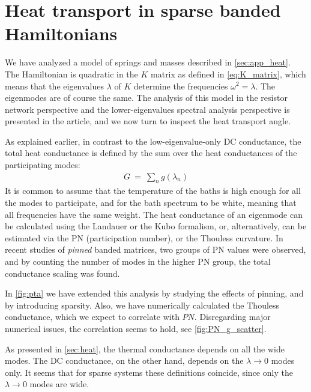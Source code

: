 \section{Heat transport in sparse banded Hamiltonians}\label{sec:PTA}


We have analyzed a model of springs and masses described in \autoref{sec:app_heat}.
The Hamiltonian is quadratic in the $K$ matrix as defined in \autoref{eq:K_matrix},
which means that the eigenvalues $\lambda$ of $K$ determine the frequencies $\omega^2 = \lambda$.
The eigenmodes are of course the same. The analysis of this model in the resistor network perspective
and the lower-eigenvalues spectral analysis perspective is presented in the article, and we now
turn to inspect the heat transport angle.


As explained earlier, in contrast to the low-eigenvalue-only DC conductance, 
the total heat conductance is defined by the
sum over the heat conductances of the participating modes:
%
\begin{align}
G \ =\ \sum_n g(\lambda_n)
\end{align}
%
It is common to assume
that the temperature of the baths is high enough for all the modes to
participate, and for the bath spectrum to be white, meaning that all frequencies
have the same weight. The heat conductance of an eigenmode can be calculated
using the Landauer or the Kubo formalism, or, alternatively, can be estimated
via the PN (participation number), or the Thouless curvature. 
In recent studies \cite{bodyfelt_unpub} of \emph{pinned} banded matrices,
two groups of PN values were observed, and by counting the number of modes in the
higher PN group, the total conductance scaling was found. 



In \autoref{fig:pta} we have extended this analysis by studying the
effects of pinning, and by introducing sparsity. Also, we have
numerically calculated the Thouless conductance,
which we expect to correlate with $PN$. Disregarding major numerical issues,
the correlation seems to hold, see \autoref{fig:PN_g_scatter}.


As presented in \autoref{sec:heat}, the thermal conductance depends
on all the wide modes. The DC conductance, on the other hand,
depends on the $\lambda\rightarrow 0$ modes only. It seems that
for sparse systems these definitions coincide, since only 
the $\lambda\rightarrow 0$ modes are wide.



